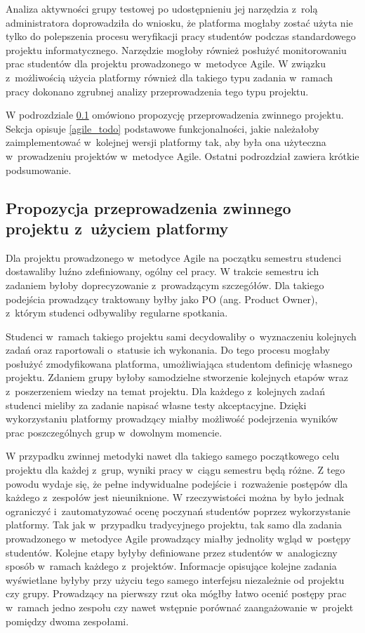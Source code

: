 Analiza aktywności grupy testowej po udostępnieniu jej narzędzia z~rolą administratora doprowadziła do wniosku, że platforma mogłaby zostać użyta nie tylko do polepszenia procesu weryfikacji pracy studentów podczas standardowego projektu informatycznego.
Narzędzie mogłoby również posłużyć monitorowaniu prac studentów dla projektu prowadzonego w~metodyce Agile.
W związku z~możliwością użycia platformy również dla takiego typu zadania w~ramach pracy dokonano zgrubnej analizy przeprowadzenia tego typu projektu.

W podrozdziale \ref{agile_proposition} omówiono propozycję przeprowadzenia zwinnego projektu.
Sekcja opisuje \ref{agile_todo} podstawowe funkcjonalności, jakie należałoby zaimplementować w~kolejnej wersji platformy tak, aby była ona użyteczna w~prowadzeniu projektów w~metodyce Agile.
Ostatni podrozdział zawiera krótkie podsumowanie.

\subsection{Propozycja przeprowadzenia zwinnego projektu z~użyciem platformy}
\label{agile_proposition}

Dla projektu prowadzonego w~metodyce Agile na początku semestru studenci dostawaliby luźno zdefiniowany, ogólny cel pracy.
W trakcie semestru ich zadaniem byłoby doprecyzowanie z~prowadzącym szczegółów.
Dla takiego podejścia prowadzący traktowany byłby jako PO (ang. Product Owner), z~którym studenci odbywaliby regularne spotkania.

Studenci w~ramach takiego projektu sami decydowaliby o~wyznaczeniu kolejnych zadań oraz raportowali o~statusie ich wykonania.
Do tego procesu mogłaby posłużyć zmodyfikowana platforma, umożliwiająca studentom definicję własnego projektu.
Zdaniem grupy byłoby samodzielne stworzenie kolejnych etapów wraz z~poszerzeniem wiedzy na temat projektu.
Dla każdego z~kolejnych zadań studenci mieliby za zadanie napisać własne testy akceptacyjne.
Dzięki wykorzystaniu platformy prowadzący miałby możliwość podejrzenia wyników prac poszczególnych grup w~dowolnym momencie.

W przypadku zwinnej metodyki nawet dla takiego samego początkowego celu projektu dla każdej z~grup, wyniki pracy w~ciągu semestru będą różne.
Z tego powodu wydaje się, że pełne indywidualne podejście i~rozważenie postępów dla każdego z~zespołów jest nieuniknione.
W rzeczywistości można by było jednak ograniczyć i~zautomatyzować ocenę poczynań studentów poprzez wykorzystanie platformy.
Tak jak w~przypadku tradycyjnego projektu, tak samo dla zadania prowadzonego w~metodyce Agile prowadzący miałby jednolity wgląd w~postępy studentów.
Kolejne etapy byłyby definiowane przez studentów w~analogiczny sposób w~ramach każdego z~projektów.
Informacje opisujące kolejne zadania wyświetlane byłyby przy użyciu tego samego interfejsu niezależnie od projektu czy grupy.
Prowadzący na pierwszy rzut oka mógłby łatwo ocenić postępy prac w~ramach jedno zespołu czy nawet wstępnie porównać zaangażowanie w~projekt pomiędzy dwoma zespołami.

